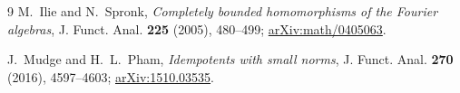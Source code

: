\documentclass[11pt]{article}
\begin{document}
\begin{thebibliography}{9}
M.~Ilie and N.~Spronk,
\emph{Completely bounded homomorphisms of the Fourier algebras},
J. Funct. Anal. \textbf{225} (2005), 480--499;
\href{https://arxiv.org/abs/math/0405063}{arXiv:math/0405063}.

J.~Mudge and H.~L.~Pham,
\emph{Idempotents with small norms},
J. Funct. Anal. \textbf{270} (2016), 4597--4603;
\href{https://arxiv.org/abs/1510.03535}{arXiv:1510.03535}.
\end{thebibliography}
\end{document}
